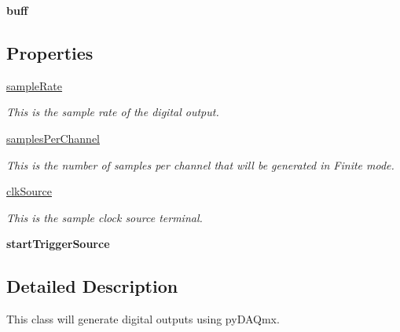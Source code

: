 \begin{DoxyCompactItemize}
\item 
\hypertarget{class_chassis_8git_1_1_digital_output_1_1_digital_output_aacb0740743e35148f9225dad57366d75}{{\bfseries buff}}\label{class_chassis_8git_1_1_digital_output_1_1_digital_output_aacb0740743e35148f9225dad57366d75}

\end{DoxyCompactItemize}
\subsection*{Properties}
\begin{DoxyCompactItemize}
\item 
\hyperlink{class_chassis_8git_1_1_digital_output_1_1_digital_output_a46deeb00292a346ffa3eb95ab37118ac}{sample\-Rate}
\begin{DoxyCompactList}\small\item\em This is the sample rate of the digital output. \end{DoxyCompactList}\item 
\hyperlink{class_chassis_8git_1_1_digital_output_1_1_digital_output_af81269c5bfd307e6b82d645552e5a13f}{samples\-Per\-Channel}
\begin{DoxyCompactList}\small\item\em This is the number of samples per channel that will be generated in Finite mode. \end{DoxyCompactList}\item 
\hyperlink{class_chassis_8git_1_1_digital_output_1_1_digital_output_ac73336fea1019e4177461ac06c3f26a7}{clk\-Source}
\begin{DoxyCompactList}\small\item\em This is the sample clock source terminal. \end{DoxyCompactList}\item 
{\bfseries start\-Trigger\-Source}
\end{DoxyCompactItemize}


\subsection{Detailed Description}
This class will generate digital outputs using py\-D\-A\-Qmx. 



